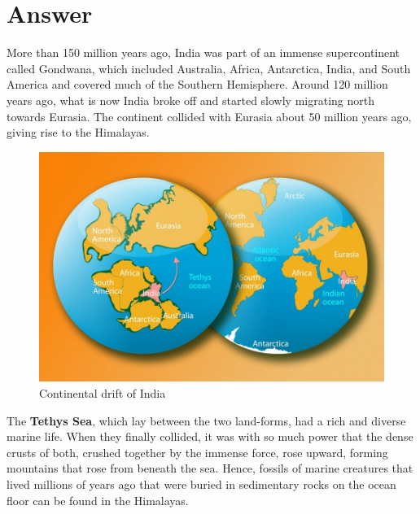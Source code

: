 \documentclass[12pt]{article}
\begin{document}
\section*{Answer}
More than 150 million years ago, India was part of an immense supercontinent called Gondwana, which included Australia, Africa, Antarctica, India, and South America and covered much of the Southern Hemisphere. Around 120 million years ago, what is now India broke off and started slowly migrating north towards Eurasia. The continent collided with Eurasia about 50 million years ago, giving rise to the Himalayas.
\begin{figure}[h!]
    \centering
      \includegraphics[width=\columnwidth /2]{Figures/MIT-FastDrift_0.jpg}
    \caption{Continental drift of India}\nonumber
\end{figure}
\par The \textbf{Tethys Sea}, which lay between the two land-forms, had a rich and diverse marine life. When they finally collided, it was with so much power that the dense crusts of both, crushed together by the immense force, rose upward, forming mountains that rose from beneath the sea. Hence, fossils of marine creatures that lived millions of years ago that were buried in sedimentary rocks on the ocean floor can be found in the Himalayas.
\end{document}
